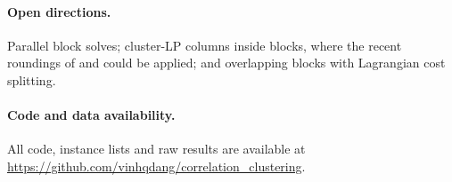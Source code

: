 \documentclass[11pt]{article}
\theoremstyle{definition}
\begin{document}
\paragraph{Open directions.}  Parallel block solves; cluster-LP columns
inside blocks, where the recent roundings of \citet{CaoCLLNV24} and
\citet{GarciaSorianoS26} could be applied; and overlapping blocks with
Lagrangian cost splitting.

\paragraph{Code and data availability.}  All code, instance lists and raw
results are available at
\url{https://github.com/vinhqdang/correlation_clustering}.



\end{document}
